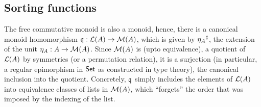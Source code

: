 \subsection{Sorting functions}
\label{sec:sorting}

The free commutative monoid is also a monoid, hence, there is a canonical monoid homomorphism
$\mathfrak{q} : \mathcal{L}(A) \to \mathcal{M}(A)$, which is given by ${\eta_A}^{\sharp}$, the extension of the unit $\eta_A : A \to \mathcal{M}(A)$.
%
Since $\mathcal{M}(A)$ is (upto equivalence), a quotient of $\mathcal{L}(A)$ by symmetries (or a permutation relation),
it is a surjection (in particular, a regular epimorphism in $\mathsf{Set}$ as constructed in type theory),
the canonical inclusion into the quotient.
%
Concretely, $\mathfrak{q}$ simply includes the elements of $\mathcal{L}(A)$ into equivalence classes of lists in $\mathcal{M}(A)$,
which ``forgets'' the order that was imposed by the indexing of the list.

